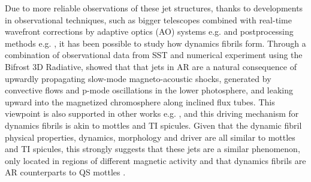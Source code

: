 \documentclass[12pt]{ociamthesis}
\begin{document}
%
Due to more reliable observations of these jet structures, thanks to developments in observational techniques, such as bigger telescopes combined with real-time wavefront corrections by adaptive optics (AO) systems e.g. \citep{Scharmer2003SPIE4853370S,Rimmele2000SPIE4007218R} and postprocessing methods e.g. \citep{van2005SoPh228191V,von1993AA268374V}, it has been possible to study how dynamics fibrils form. Through a combination of observational data from SST and numerical experiment using the Bifrost 3D Radiative, \cite{Hansteen2006ApJ} showed that that jets in AR are a natural consequence of upwardly propagating slow-mode magneto-acoustic shocks, generated by convective flows and p-mode oscillations in the lower photosphere, and leaking upward into the magnetized chromosphere along inclined flux tubes. This viewpoint is also supported in other works e.g. \citep{Heggland2007ApJ6661277H,De_Pontieu2007ApJ,Pontieu2004Natur,Suematsu1990LNP367211S}, and this driving mechanism for dynamics fibrils is akin to mottles and TI spicules. Given that the dynamic fibril physical properties, dynamics, morphology and driver are all similar to mottles and TI spicules, this strongly suggests that these jets are a similar phenomenon, only located in regions of different magnetic activity and that dynamics fibrils are AR counterparts to QS mottles \citep{Rouppe2007ApJ660L169R}.
\end{document}
